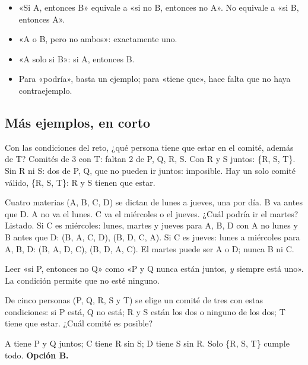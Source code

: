 \begin{regla}
\begin{itemize}
  \item «Si A, entonces B» equivale a «si no B, entonces no A». No equivale a «si B, entonces A».
  \item «A o B, pero no ambos»: exactamente uno.
  \item «A solo si B»: si A, entonces B.
  \item Para «podría», basta un ejemplo; para «tiene que», hace falta que no haya contraejemplo.
\end{itemize}
\end{regla}

\subsection{Más ejemplos, en corto}
\begin{ejemplo}
Con las condiciones del reto, ¿qué persona tiene que estar en el comité, además de T?
\solucion Comités de 3 con T: faltan 2 de P, Q, R, S. Con R y S juntos: \{R, S, T\}. Sin R ni S: dos de P, Q, que no
pueden ir juntos: imposible. Hay un solo comité válido, \{R, S, T\}: R y S tienen que estar.
\end{ejemplo}

\begin{ejemplo}[Horario]
Cuatro materias (A, B, C, D) se dictan de lunes a jueves, una por día. B va antes que D. A no va el lunes. C va el
miércoles o el jueves. ¿Cuál podría ir el martes?
\solucion Listado. Si C es miércoles: lunes, martes y jueves para A, B, D con A no lunes y B antes que D: (B, A, C, D),
(B, D, C, A). Si C es jueves: lunes a miércoles para A, B, D: (B, A, D, C), (B, D, A, C). El martes puede ser A o D; nunca
B ni C.
\end{ejemplo}

\begin{trampa}
Leer «si P, entonces no Q» como «P y Q nunca están juntos, \emph{y} siempre está uno». La condición permite que no esté
ninguno.
\end{trampa}

\begin{reto}
De cinco personas (P, Q, R, S y T) se elige un comité de tres con estas condiciones: si P está, Q no está; R y S están
los dos o ninguno de los dos; T tiene que estar. ¿Cuál comité es posible?
\end{reto}

\begin{retoresuelto}
A tiene P y Q juntos; C tiene R sin S; D tiene S sin R. Solo \{R, S, T\} cumple todo. \textbf{Opción B.}
\end{retoresuelto}

